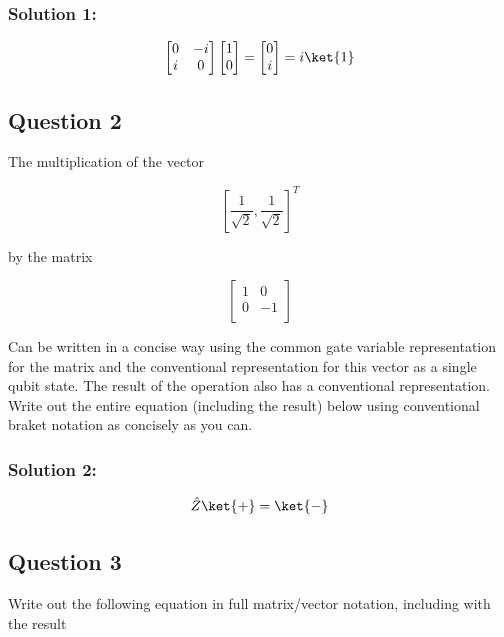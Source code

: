 \documentclass{article}
\begin{document}
\subsubsection*{Solution 1:}

\[\begin{bmatrix}0&-i\\i&0\end{bmatrix}\begin{bmatrix}1\\0\end{bmatrix}=\begin{bmatrix}0\\i\end{bmatrix}=i\ket{1}\]


\subsection*{Question 2}

The multiplication of the vector

$${\left[ \frac{1}{\sqrt{2}}, \frac{1}{\sqrt{2}}\right]}^T$$

by the matrix

\begin{equation*}
    \begin{bmatrix}
        1 & 0 \\
        0 & -1 \\
    \end{bmatrix}
\end{equation*}

Can be written in a concise way using the common gate variable representation for the matrix and the conventional representation for this vector as a single qubit state. The result of the operation also has a conventional representation. Write out the entire equation (including the result) below using conventional braket notation as concisely as you can.

\subsubsection*{Solution 2:}

\[\hat Z\ket{+}=\ket{-}\]


\subsection*{Question 3}

Write out the following equation in full matrix/vector notation, including with the result
\end{document}
